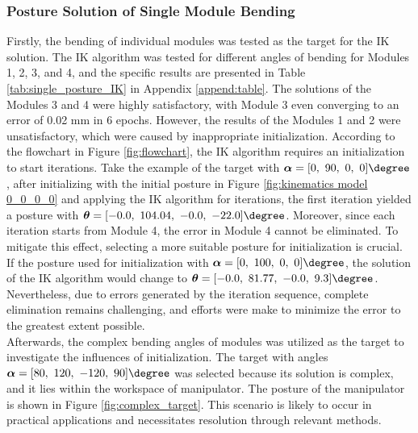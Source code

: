\subsubsection{Posture Solution of Single Module Bending}
Firstly, the bending of individual modules was tested as the target for the IK solution. The 
IK algorithm was tested for different angles of bending for Modules 1, 2, 3, and 4, and the 
specific results are presented in Table \ref{tab:single_posture_IK} in Appendix \ref{append:table}. The 
solutions of the Modules 3 and 4 were highly satisfactory, with Module 3 even converging to an error of 0.02 mm 
in 6 epochs. However, the results of the Modules 1 and 2 were unsatisfactory, which were caused by inappropriate 
initialization. According to the flowchart in Figure \ref{fig:flowchart}, the IK algorithm requires an 
initialization to start iterations. Take the example of the target with 
$\boldsymbol{\alpha} = [0,\ 90,\ 0,\ 0]\degree$, after initializing with the initial posture in Figure 
\ref{fig:kinematics model 0_0_0_0} and applying the IK algorithm for iterations, the first iteration yielded 
a posture with 
$\boldsymbol{\theta} = [-0.0,\ 104.04,\ -0.0,\ -22.0]\degree$. Moreover, since each iteration starts from Module 4, 
the error in Module 4 cannot be eliminated. To mitigate this effect, selecting a more suitable posture for 
initialization is crucial. If the posture used for initialization with 
$\boldsymbol{\alpha} = [0,\ 100,\ 0,\ 0]\degree$, the solution of the IK algorithm would change to 
$\boldsymbol{\theta} = [-0.0,\ 81.77,\ -0.0,\ 9.3]\degree$. Nevertheless, due to errors generated by the 
iteration sequence, complete elimination remains challenging, and efforts were make to minimize the error to the 
greatest extent possible.  \\
Afterwards, the complex bending angles of modules was utilized as the target to investigate the influences of initialization. 
The target with angles $\boldsymbol{\alpha} = [80,\ 120,\ -120,\ 90]\degree$ was selected because its solution is complex, 
and it lies within the workspace of manipulator. The posture of the manipulator is shown in Figure 
\ref{fig:complex_target}. This scenario is likely to occur in practical applications and necessitates resolution 
through relevant methods.
